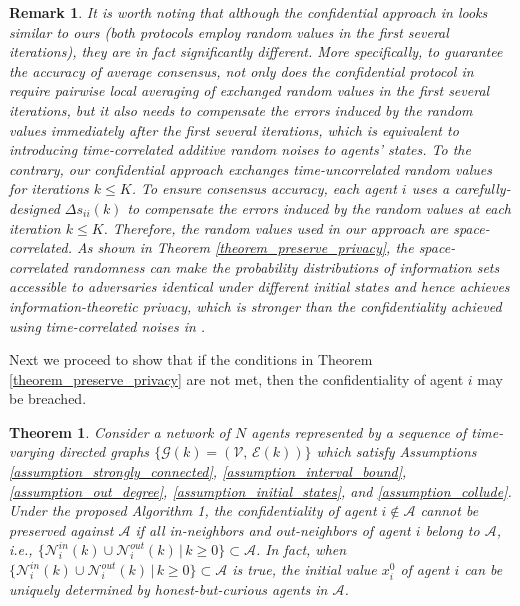 \documentclass{IEEEtran}
\newtheorem{Theorem}{Theorem}
\newtheorem{Remark}{Remark}
\begin{document}
\begin{Remark}\label{remark_time_space_difference}
	It is worth noting that although the confidential approach in \cite{pilet2019robust} looks similar to ours (both protocols employ random values in the first several iterations), they are in fact significantly different. More specifically, to guarantee the accuracy of average consensus, not only does the confidential protocol in \cite{pilet2019robust} require pairwise local averaging of exchanged random values in the first several iterations, but it also needs to compensate the errors induced by the random values immediately after the first several iterations, which is equivalent to introducing time-correlated additive random noises to agents' states. To the contrary, our confidential approach exchanges time-uncorrelated random values for iterations $k \leq K$. To ensure consensus accuracy, each agent $i$ uses a carefully-designed $\Delta s_{ii}(k)$ to compensate the errors induced by the random values at each iteration $k \leq K$. Therefore, the random values used in our approach are space-correlated. As shown in Theorem \ref{theorem_preserve_privacy}, the space-correlated randomness can make the probability distributions of information sets accessible to adversaries identical under different initial states and hence achieves information-theoretic privacy, which is stronger than the confidentiality achieved using time-correlated noises in \cite{pilet2019robust}.
\end{Remark}

Next we proceed to show that if the conditions in Theorem \ref{theorem_preserve_privacy} are not met, then the confidentiality of agent $i$ may be breached. 

\begin{Theorem}\label{theorem_no_privacy}
Consider a network of $N$ agents represented by a sequence of time-varying directed graphs $\{\mathcal{G}(k)=(\mathcal{V}, \, \mathcal{E}(k))\}$ which satisfy Assumptions \ref{assumption_strongly_connected}, \ref{assumption_interval_bound}, \ref{assumption_out_degree}, \ref{assumption_initial_states}, and \ref{assumption_collude}. Under the proposed Algorithm 1, the confidentiality of agent $i\notin \mathcal{A}$ cannot be preserved against $\mathcal{A}$ if all in-neighbors and out-neighbors of agent $i$ belong to $\mathcal{A}$, i.e., $\{\mathcal{N}_i^{in}(k)\cup \mathcal{N}_i^{out}(k) \, \big| \, k \geq 0 \} \subset \mathcal{A}$. In fact, when $\{\mathcal{N}_i^{in}(k)\cup \mathcal{N}_i^{out}(k) \, \big| \, k \geq 0 \} \subset \mathcal{A}$ is true, the initial value $x_i^0$ of agent $i$ can be uniquely determined by honest-but-curious agents in $\mathcal{A}$.
\end{Theorem}
\end{document}
